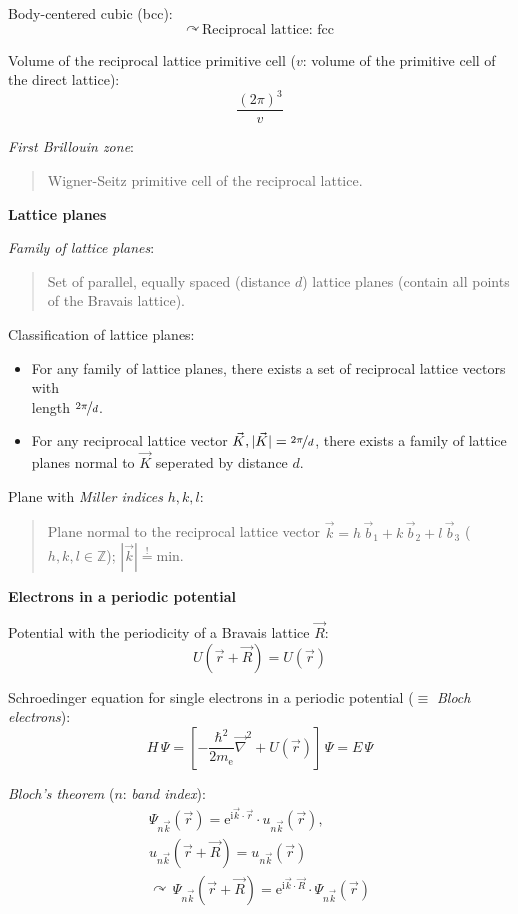 \documentclass[fontsize=11pt,a4paper]{scrartcl}
\begin{document}
Body-centered cubic (bcc):
\[
	\curvearrowright\,\text{Reciprocal lattice: fcc}
\]

Volume of the reciprocal lattice primitive cell ($v$: volume of the primitive cell of the direct lattice):
\[
	\frac{(2\pi)^3}{v}
\]

\emph{First Brillouin zone}:
\begin{quote}
	Wigner-Seitz primitive cell of the reciprocal lattice.
\end{quote}

\textbf{\normalsize{Lattice planes}}

\emph{Family of lattice planes}:
\begin{quote}
	Set of parallel, equally spaced (distance $d$) lattice planes (contain all points of the Bravais lattice).
\end{quote}

Classification of lattice planes:
\begin{itemize}
	\item For any family of lattice planes, there exists a set of reciprocal lattice vectors with\\ length $\nicefrac{2\pi}{d}$.
	\item For any reciprocal lattice vector $\vec K, |\vec K|=\nicefrac{2\pi}{d}$, there exists a family of lattice planes normal to $\vec K$ seperated by distance $d$.
\end{itemize}

Plane with \emph{Miller indices} $h,k,l$:
\begin{quote}
	Plane normal to the reciprocal lattice vector $\vec k=h\,\vec b_1+k\,\vec b_2+l\,\vec b_3$ ($h,k,l\in\mathbb{Z}$); $|\vec k|\stackrel{!}{=}\text{min}$.
\end{quote}

\textbf{\Large{Electrons in a periodic potential}}

Potential with the periodicity of a Bravais lattice $\vec R$:
\[
	U(\vec r+\vec R)=U(\vec r)
\]

Schroedinger equation for single electrons in a periodic potential ($\equiv$ \emph{Bloch electrons}):
\[
	H\,\Psi=\left[-\frac{\hbar^2}{2m_\mathrm{e}}\vec\nabla^2+U(\vec r)\right]\,\Psi=E\,\Psi
\]

\emph{Bloch's theorem} ($n$: \emph{band index}):
\begin{gather*}
	\Psi_{n\vec k}(\vec r)=\mathrm{e}^{\mathrm{i}\vec k\cdot\vec r}\cdot u_{n\vec k}(\vec r),\\
	u_{n\vec k}(\vec r+\vec R)=u_{n\vec k}(\vec r)\\
	\curvearrowright\,\Psi_{n\vec k}(\vec r+\vec R)=\mathrm{e}^{\mathrm{i}\vec k\cdot\vec R}\cdot\Psi_{n\vec k}(\vec r)
\end{gather*}
\end{document}
